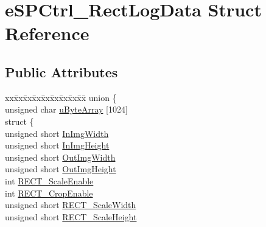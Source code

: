 \hypertarget{structe_s_p_ctrl___rect_log_data}{}\section{e\+S\+P\+Ctrl\+\_\+\+Rect\+Log\+Data Struct Reference}
\label{structe_s_p_ctrl___rect_log_data}
\subsection*{Public Attributes}
\begin{DoxyCompactItemize}
\item 
\mbox{\label{structe_s_p_ctrl___rect_log_data_ae83fd25ba652721ad5dca03fca105089}} 
\begin{tabbing}
xx\=xx\=xx\=xx\=xx\=xx\=xx\=xx\=xx\=\kill
union \{\\
\>unsigned char \hyperlink{structe_s_p_ctrl___rect_log_data_a15a8274185b2ab04ef9c3751ab38c135}{uByteArray} \mbox{[}1024\mbox{]}\\
\mbox{\label{unione_s_p_ctrl___rect_log_data_1_1_0D2_a219d907f9e63d0fc84cf8d578da318d3}} 
\>struct \{\\
\>\>unsigned short \hyperlink{structe_s_p_ctrl___rect_log_data_aa54ae4167cbc52369655fc110005a013}{InImgWidth}\\
\>\>unsigned short \hyperlink{structe_s_p_ctrl___rect_log_data_a46561d7a99c025093ec4c1fc5f606f0c}{InImgHeight}\\
\>\>unsigned short \hyperlink{structe_s_p_ctrl___rect_log_data_a895f7a7312de9488e5e844593ea04315}{OutImgWidth}\\
\>\>unsigned short \hyperlink{structe_s_p_ctrl___rect_log_data_aa028c342aac2500eb2ce7284e2582db6}{OutImgHeight}\\
\>\>int \hyperlink{structe_s_p_ctrl___rect_log_data_af8b67e4348a7113dd2808228e6a3ebf3}{RECT\_ScaleEnable}\\
\>\>int \hyperlink{structe_s_p_ctrl___rect_log_data_ac9cbd320971d5a570ba4e7d70a30c4ef}{RECT\_CropEnable}\\
\>\>unsigned short \hyperlink{structe_s_p_ctrl___rect_log_data_a77cb8e8c695e7b48becbc05b4d540ce5}{RECT\_ScaleWidth}\\
\>\>unsigned short \hyperlink{structe_s_p_ctrl___rect_log_data_a4069c6adebdf2f6becb4a1a072af70c1}{RECT\_ScaleHeight}\\

\end{tabbing}
\end{DoxyCompactItemize}
